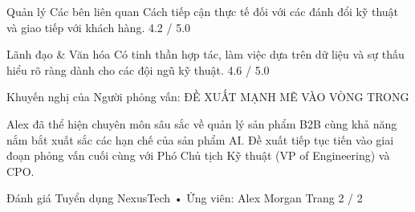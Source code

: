 \documentclass[12pt]{article}
\begin{document}
Quản lý Các bên liên quan
Cách tiếp cận thực tế đối với các đánh đổi kỹ thuật và giao tiếp với khách hàng.
4.2 / 5.0

Lãnh đạo \& Văn hóa
Có tinh thần hợp tác, làm việc dựa trên dữ liệu và sự thấu hiểu rõ ràng dành cho các đội ngũ kỹ thuật.
4.6 / 5.0

Khuyến nghị của Người phỏng vấn: ĐỀ XUẤT MẠNH MẼ VÀO VÒNG TRONG

Alex đã thể hiện chuyên môn sâu sắc về quản lý sản phẩm B2B cùng khả năng nắm bắt xuất sắc các hạn chế của sản phẩm AI. Đề xuất tiếp tục tiến vào giai đoạn phỏng vấn cuối cùng với Phó Chủ tịch Kỹ thuật (VP of Engineering) và CPO.

Đánh giá Tuyển dụng NexusTech • Ứng viên: Alex Morgan
Trang 2 / 2
\end{document}
